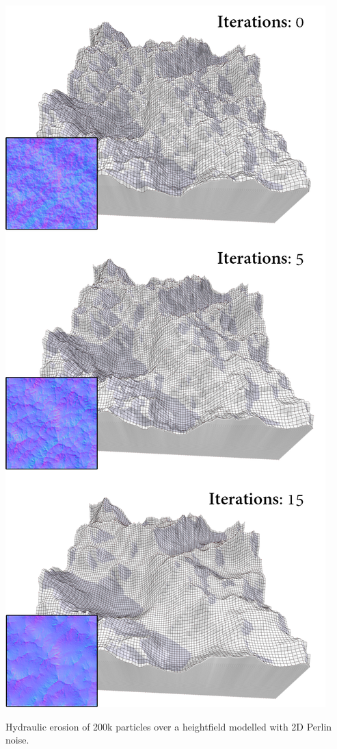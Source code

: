 \begin{marginfigure}[.cm]
    \centering
    \includegraphics[width=\linewidth]{figs/lidar_simulation/erosion.png}
	\caption{Hydraulic erosion of 200k particles over a heightfield modelled with 2D Perlin noise. }
	\label{fig:hydraulic_erosion}
\end{marginfigure}
